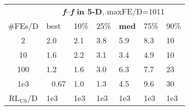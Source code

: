 \begin{tabular}{c|llllll}
 & \multicolumn{6}{|c}{\textbf{\textit{f}\raisebox{-0.35ex}{1}--\textit{f}\raisebox{-0.35ex}{24} in 5-D}, maxFE/D=1011}\\
\#FEs/D & best & 10\% & 25\% & \textbf{med} & 75\% & 90\%\\
2 & \hspace*{1ex}2.0 & \hspace*{1ex}2.1 & \hspace*{1ex}3.8 & \hspace*{1ex}5.9 & \hspace*{1ex}8.3 & 10\\
10 & \hspace*{1ex}1.6 & \hspace*{1ex}2.2 & \hspace*{1ex}3.1 & \hspace*{1ex}3.4 & \hspace*{1ex}4.9 & 10\\
100 & \hspace*{1ex}1.2 & \hspace*{1ex}1.6 & \hspace*{1ex}3.0 & \hspace*{1ex}6.3 & \hspace*{1ex}7.7 & 23\\
1e3 & ~\,0.67 & \hspace*{1ex}1.0 & \hspace*{1ex}1.3 & \hspace*{1ex}4.5 & \hspace*{1ex}9.6 & 30\\
$\text{RL}_{\text{US}}$/D & 1e3 & 1e3 & 1e3 & 1e3 & 1e3 & 1e3
\end{tabular}
